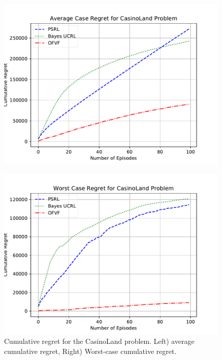 \documentclass{article}
\theoremstyle{plain}
\theoremstyle{definition}
\begin{document}
\begin{figure}
	\centering
	\begin{minipage}[c]{.85\columnwidth}
		\centering
		\includegraphics[width=\linewidth]{fig/casino_land_averagecase_Bayes_PSRL_OFVF.pdf}\\
	\end{minipage}%
	\begin{minipage}[c]{.85\columnwidth}
		\centering
		\includegraphics[width=\linewidth]{fig/casino_land__worstcase_Bayes_PSRL_OFVF.pdf}
	\end{minipage}%
	\caption{Cumulative regret for the CasinoLand problem. Left) average cumulative regret, Right) Worst-case cumulative regret.}
	\label{fig:casinoland}
\end{figure}
\end{document}
